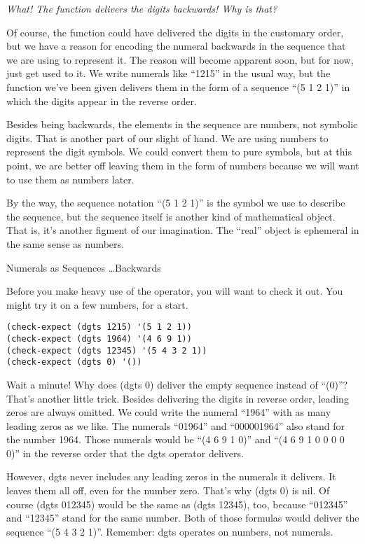 \begin{aside}
\emph{What! The function delivers the digits backwards! Why is that?}

Of course, the function could have delivered the digits in the
customary order, but we have a reason for encoding the numeral
backwards in the sequence that we are using to represent it.
The reason will become apparent soon, but for now, just get used
to it. We write numerals like ``1215'' in the usual way, but
the function we've been given delivers them in the form of
a sequence ``(5 1 2 1)'' in which the digits appear in the
reverse order.

Besides being backwards, the elements in the sequence are numbers,
not symbolic digits.
That is another part of our slight of hand.
We are using numbers to represent the digit symbols.
We could convert them to pure symbols,
but at this point, we are better off leaving them in the form of numbers
because we will want to use them as numbers later.

By the way, the sequence notation ``(5 1 2 1)'' is the symbol we use
to describe the sequence, but the sequence itself is another kind of mathematical object.
That is, it's another figment of our imagination.
The ``real'' object is ephemeral in the same sense as numbers.
\caption{Numerals as Sequences \dots Backwards}
\label{numeral-as-sequence}
\end{aside}

Before you make heavy use of the operator, you will want to check it out.
You might try it on a few numbers, for a start.
\begin{lstlisting}
(check-expect (dgts 1215) '(5 1 2 1))
(check-expect (dgts 1964) '(4 6 9 1))
(check-expect (dgts 12345) '(5 4 3 2 1))
(check-expect (dgts 0) '())
\end{lstlisting}

Wait a minute!
Why does (dgts 0) deliver the empty sequence instead of ``(0)''?
That's another little trick.
Besides delivering the digits in reverse order, leading zeros are always omitted.
We could write the numeral ``1964'' with as many leading zeros as we like.
The numerals ``01964'' and ``000001964'' also stand for the number 1964.
Those numerals would be ``(4 6 9 1 0)'' and ``(4 6 9 1 0 0 0 0 0)'' in
the reverse order that the dgts operator delivers.

However, dgts never includes any leading zeros in the numerals it delivers.
It leaves them all off, even for the number zero.
That's why (dgts 0) is nil.
Of course (dgts 012345) would be the same as (dgts 12345), too,
because ``012345'' and ``12345'' stand for the same number.
Both of those formulas would deliver the sequence ``(5 4 3 2 1)''.
Remember: dgts operates on numbers, not numerals.

